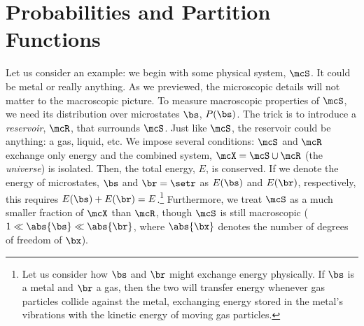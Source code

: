 \section{Probabilities and Partition Functions}
Let us consider an example: we begin with some physical system,
$\mcS$. It could be metal or really anything. As we previewed, the
microscopic details will not matter to the macroscopic picture. To
measure macroscopic properties of $\mcS$, we need its distribution
over microstates $\bs$, $P(\bs)$. The trick is to introduce a
\textit{reservoir}, $\mcR$, that surrounds $\mcS$. Just like
$\mcS$, the reservoir could be anything: a gas, liquid, etc. We impose
several conditions: $\mcS$ and $\mcR$ exchange only energy and the
combined system, $\mcX=\mcS\cup \mcR$ (the \textit{universe}) is
isolated. Then, the total energy, $E$, is conserved.  If we denote the
energy of microstates, $\bs$ and $\br=\setr$ as $E(\bs)$ and $E(\br)$, respectively, this
requires $E(\bs)+E(\br)=E$.\footnote{Let us consider how $\bs$ and
  $\br$ might exchange energy physically. If $\bs$ is a metal and
  $\br$ a gas, then the two will transfer energy whenever gas
  particles collide against the metal, exchanging energy stored in the
  metal's vibrations with the kinetic energy of moving gas
  particles.} Furthermore, we treat $\mcS$ as a much smaller fraction of
$\mcX$ than $\mcR$, though $\mcS$ is still macroscopic
($1\ll\abs{\bs}\ll\abs{\br}$, where $\abs{\bx}$ denotes the number of
degrees of freedom of $\bx$).

